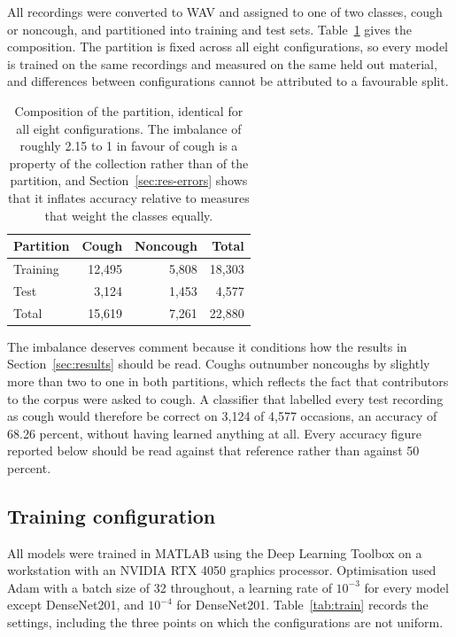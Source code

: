 All recordings were converted to WAV and assigned to one of two classes,
cough or noncough, and partitioned into training and test sets.
Table~\ref{tab:split} gives the composition. The partition is fixed across all
eight configurations, so every model is trained on the same recordings and
measured on the same held out material, and differences between configurations
cannot be attributed to a favourable split.

\begin{table}[t]
\centering
\footnotesize
\caption{Composition of the partition, identical for all eight
configurations. The imbalance of roughly 2.15 to 1 in favour of cough is a
property of the collection rather than of the partition, and
Section~\ref{sec:res-errors} shows that it inflates accuracy relative to
measures that weight the classes equally.}
\label{tab:split}
\begin{tabular}{@{}lrrr@{}}
\toprule
Partition & Cough & Noncough & Total \\
\midrule
Training & 12{,}495 & 5{,}808 & 18{,}303 \\
Test & 3{,}124 & 1{,}453 & 4{,}577 \\
\midrule
Total & 15{,}619 & 7{,}261 & 22{,}880 \\
\bottomrule
\end{tabular}
\end{table}

The imbalance deserves comment because it conditions how the results in
Section~\ref{sec:results} should be read. Coughs outnumber noncoughs by
slightly more than two to one in both partitions, which reflects the fact that
contributors to the corpus were asked to cough. A classifier that labelled
every test recording as cough would therefore be correct on 3,124 of 4,577
occasions, an accuracy of 68.26 percent, without having learned anything at
all. Every accuracy figure reported below should be read against that
reference rather than against 50 percent.

\subsection{Training configuration}\label{sec:s-train}

All models were trained in MATLAB using the Deep Learning Toolbox on a
workstation with an NVIDIA RTX 4050 graphics processor. Optimisation used
Adam with a batch size of 32 throughout, a learning rate of $10^{-3}$ for
every model except DenseNet201, and $10^{-4}$ for DenseNet201.
Table~\ref{tab:train} records the settings, including the three points on
which the configurations are not uniform.

